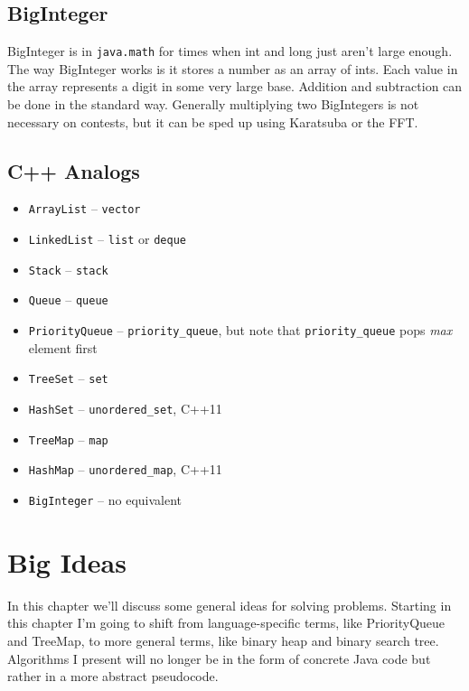 \documentclass[11pt]{book}
\begin{document}
\section{BigInteger}

BigInteger is in \texttt{java.math} for times when int and long just aren't large enough. The way BigInteger works is it stores a number as an array of ints. Each value in the array represents a digit in some very large base. Addition and subtraction can be done in the standard way. Generally multiplying two BigIntegers is not necessary on contests, but it can be sped up using Karatsuba or the FFT.

\section{C++ Analogs}

\begin{itemize}

\item \texttt{ArrayList} -- \texttt{vector}
\item \texttt{LinkedList} -- \texttt{list} or \texttt{deque}
\item \texttt{Stack} -- \texttt{stack}
\item \texttt{Queue} -- \texttt{queue}
\item \texttt{PriorityQueue} -- \texttt{priority\_queue}, but note that \texttt{priority\_queue} pops \textit{max} element first
\item \texttt{TreeSet} -- \texttt{set}
\item \texttt{HashSet} -- \texttt{unordered\_set}, C++11
\item \texttt{TreeMap} -- \texttt{map}
\item \texttt{HashMap} -- \texttt{unordered\_map}, C++11
\item \texttt{BigInteger} -- no equivalent

\end{itemize}

\chapter{Big Ideas}

In this chapter we'll discuss some general ideas for solving problems. Starting in this chapter I'm going to shift from language-specific terms, like PriorityQueue and TreeMap, to more general terms, like binary heap and binary search tree. Algorithms I present will no longer be in the form of concrete Java code but rather in a more abstract pseudocode.
\end{document}
